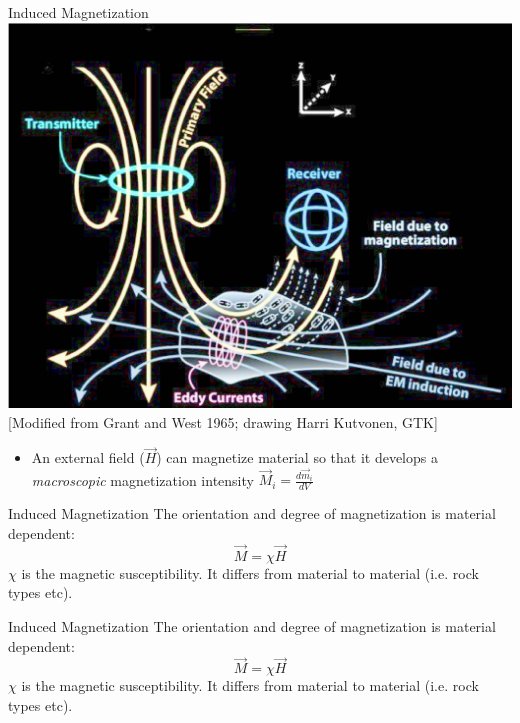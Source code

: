     \begin{frame}
      \begin{PointSix}{Induced Magnetization}
        \includegraphics[width=0.6\linewidth]{Figures/Magnetics/HBInduction_GrandAndWest1995_DrawingKulvonen.png}
        \tiny [Modified from Grant and West 1965; drawing Harri Kutvonen, GTK]

        \small
        \begin{itemize}
          \item An external field ($\vec{H}$) can magnetize material so that it develops a \textit{macroscopic} magnetization intensity $\vec{M}_i = \frac{d\vec{m}_i}{dV}$ 
        \end{itemize}
      \end{PointSix}
    \end{frame}

    \begin{frame}
      \begin{PointSix}{Induced Magnetization}
        The orientation and degree of magnetization is material dependent:
        $$
          \vec{M} = \chi \vec{H}
        $$
        $\chi$ is the magnetic susceptibility. It differs from material to material (i.e. rock types etc).
      \end{PointSix}
    \end{frame}

    \begin{frame}
      \begin{PointSix}{Induced Magnetization}
        The orientation and degree of magnetization is material dependent:
        $$
          \vec{M} = \chi \vec{H}
        $$
        $\chi$ is the magnetic susceptibility. It differs from material to material (i.e. rock types etc).
      \end{PointSix}
    \end{frame}

